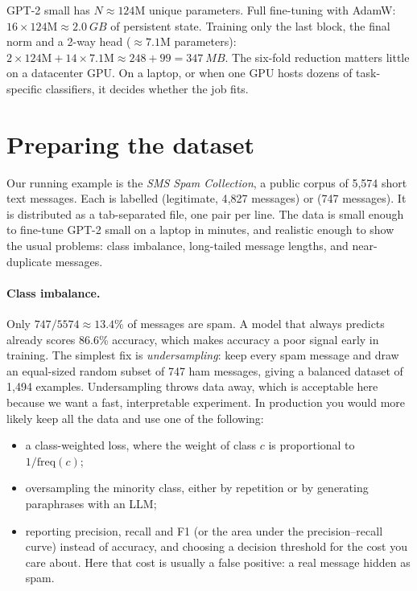 \begin{napkinmath}
GPT-2 small has $N\approx124\text{M}$ unique parameters. Full fine-tuning with AdamW:
$16 \times 124\text{M} \approx \SI{2.0}{GB}$ of persistent state. Training only the last
block, the final norm and a 2-way head ($\approx 7.1$M parameters):
$2 \times 124\text{M} + 14 \times 7.1\text{M} \approx 248 + 99 = \SI{347}{MB}$.
The six-fold reduction matters little on a datacenter GPU. On a laptop, or when one
GPU hosts dozens of task-specific classifiers, it decides whether the job fits.
\end{napkinmath}

\section{Preparing the dataset}\label{sec:classify:data}

Our running example is the \emph{SMS Spam Collection}, a public corpus of 5{,}574 short
text messages. Each is labelled  (legitimate, 4{,}827 messages) or
 (747 messages). It is distributed as a tab-separated file, one
 pair per line. The data is small enough to fine-tune GPT-2 small
on a laptop in minutes, and realistic enough to show the usual problems: class
imbalance, long-tailed message lengths, and near-duplicate messages.

\paragraph{Class imbalance.} Only $747/5574 \approx 13.4\%$ of messages are spam. A model
that always predicts  already scores 86.6\% accuracy, which makes accuracy a
poor signal early in training. The simplest fix is \emph{undersampling}: keep every
spam message and draw an equal-sized random subset of 747 ham messages, giving a
balanced dataset of 1{,}494 examples. Undersampling throws data away, which is
acceptable here because we want a fast, interpretable experiment. In production you
would more likely keep all the data and use one of the following:
\begin{itemize}
\item a class-weighted loss, where the weight of class $c$ is proportional to
$1/\text{freq}(c)$;
\item oversampling the minority class, either by repetition or by generating
paraphrases with an LLM;
\item reporting precision, recall and F1 (or the area under the precision--recall
curve) instead of accuracy, and choosing a decision threshold for the cost you care
about. Here that cost is usually a false positive: a real message hidden as spam.
\end{itemize}

